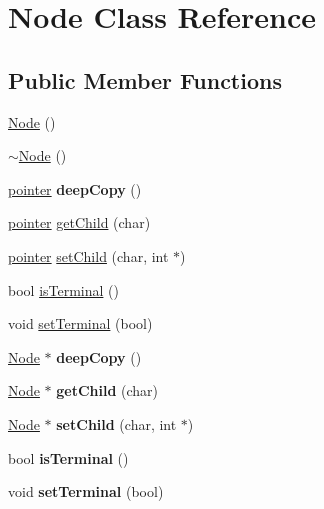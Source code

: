 \hypertarget{class_node}{}\section{Node Class Reference}
\label{class_node}
\subsection*{Public Member Functions}
\begin{DoxyCompactItemize}
\item 
\hyperlink{class_node_ad7a34779cad45d997bfd6d3d8043c75f}{Node} ()
\item 
\hyperlink{class_node_aa0840c3cb5c7159be6d992adecd2097c}{$\sim$\+Node} ()
\item 
\mbox{\label{class_node_a50cc8a8f7579baecb23595338140ef87}} 
\hyperlink{structpointer}{pointer} {\bfseries deep\+Copy} ()
\item 
\hyperlink{structpointer}{pointer} \hyperlink{class_node_a7d2c9441ae9f243e06d9f081bada8bad}{get\+Child} (char)
\item 
\hyperlink{structpointer}{pointer} \hyperlink{class_node_aeb419eb3d59dba25f792546a226643bc}{set\+Child} (char, int $\ast$)
\item 
bool \hyperlink{class_node_a8cdae92d062555a32b908bfeae6149da}{is\+Terminal} ()
\item 
void \hyperlink{class_node_a6b9cb87985f29025ad3a2905f61e94c3}{set\+Terminal} (bool)
\item 
\mbox{\label{class_node_a3d977b8e9de6d22bec1ab0e9962a2c41}} 
\hyperlink{class_node}{Node} $\ast$ {\bfseries deep\+Copy} ()
\item 
\mbox{\label{class_node_a8029130c13b941a582c6a7f29648fa36}} 
\hyperlink{class_node}{Node} $\ast$ {\bfseries get\+Child} (char)
\item 
\mbox{\label{class_node_a7ae9ef44097095d0e7d5923fe329523a}} 
\hyperlink{class_node}{Node} $\ast$ {\bfseries set\+Child} (char, int $\ast$)
\item 
\mbox{\label{class_node_a8cdae92d062555a32b908bfeae6149da}} 
bool {\bfseries is\+Terminal} ()
\item 
\mbox{\label{class_node_a6b9cb87985f29025ad3a2905f61e94c3}} 
void {\bfseries set\+Terminal} (bool)
\end{DoxyCompactItemize}


